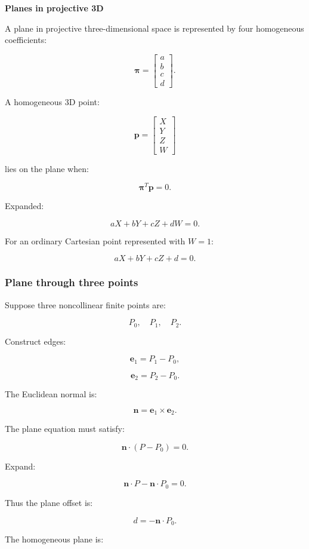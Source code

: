 \textbf{Planes in projective 3D}

A plane in projective three-dimensional space is represented by four homogeneous coefficients:

\[
 \boxed{ \boldsymbol\pi= \begin{bmatrix} a\\b\\c\\d \end{bmatrix} }.
\]

A homogeneous 3D point:

\[
 \mathbf p= \begin{bmatrix} X\\Y\\Z\\W \end{bmatrix}
\]

lies on the plane when:

\[
 \boxed{ \boldsymbol\pi^T\mathbf p=0 }.
\]

Expanded:

\[
 \boxed{ aX+bY+cZ+dW=0 }.
\]

For an ordinary Cartesian point represented with \(W=1\):

\[
 aX+bY+cZ+d=0.
\]

\subsubsection{Plane through three points}\label{02-foundations-ii-ch032-plane-through-three-points}

Suppose three noncollinear finite points are:

\[
 P_0,\quad P_1,\quad P_2.
\]

Construct edges:

\[
 \mathbf e_1=P_1-P_0,
\]

\[
 \mathbf e_2=P_2-P_0.
\]

The Euclidean normal is:

\[
 \boxed{ \mathbf n=\mathbf e_1\times\mathbf e_2 }.
\]

The plane equation must satisfy:

\[
 \mathbf n\cdot(P-P_0)=0.
\]

Expand:

\[
 \mathbf n\cdot P-\mathbf n\cdot P_0=0.
\]

Thus the plane offset is:

\[
 \boxed{ d=-\mathbf n\cdot P_0 }.
\]

The homogeneous plane is:

